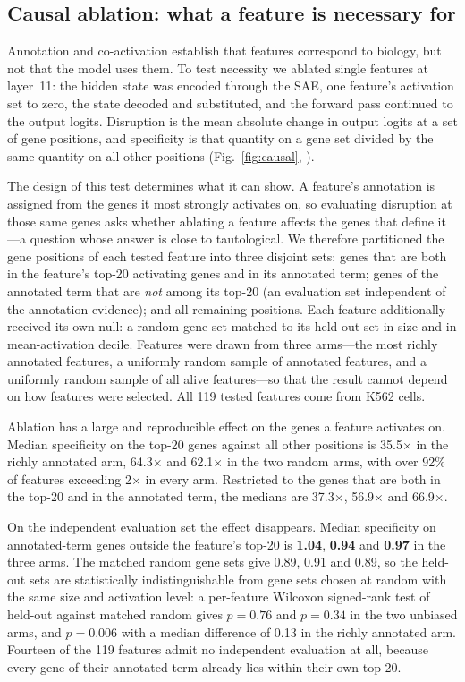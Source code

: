 \subsection*{Causal ablation: what a feature is necessary for}
\label{sec:causal}

Annotation and co-activation establish that features correspond to biology, but not that the model
uses them. To test necessity we ablated single features at layer~11: the hidden state was encoded
through the SAE, one feature's activation set to zero, the state decoded and substituted, and the
forward pass continued to the output logits. Disruption is the mean absolute change in output
logits at a set of gene positions, and specificity is that quantity on a gene set divided by the
same quantity on all other positions (Fig.~\ref{fig:causal}, ).

The design of this test determines what it can show. A feature's annotation is assigned from the
genes it most strongly activates on, so evaluating disruption at those same genes asks whether
ablating a feature affects the genes that define it---a question whose answer is close to
tautological. We therefore partitioned the gene positions of each tested feature into three disjoint
sets: genes that are both in the feature's top-20 activating genes and in its annotated term; genes
of the annotated term that are \emph{not} among its top-20 (an evaluation set independent of the
annotation evidence); and all remaining positions. Each feature additionally received its own null:
a random gene set matched to its held-out set in size and in mean-activation decile. Features were
drawn from three arms---the most richly annotated features, a uniformly random sample of annotated
features, and a uniformly random sample of all alive features---so that the result cannot depend on
how features were selected. All 119 tested features come from K562 cells.

Ablation has a large and reproducible effect on the genes a feature activates on. Median
specificity on the top-20 genes against all other positions is 35.5$\times$ in the richly annotated
arm, 64.3$\times$ and 62.1$\times$ in the two random arms, with over 92\% of features exceeding
2$\times$ in every arm. Restricted to the genes that are both in the top-20 and in the annotated
term, the medians are 37.3$\times$, 56.9$\times$ and 66.9$\times$.

On the independent evaluation set the effect disappears. Median specificity on annotated-term genes
outside the feature's top-20 is \textbf{1.04}, \textbf{0.94} and \textbf{0.97} in the three arms.
The matched random gene sets give 0.89, 0.91 and 0.89, so the held-out sets are statistically
indistinguishable from gene sets chosen at random with the same size and activation level: a
per-feature Wilcoxon signed-rank test of held-out against matched random gives $p = 0.76$ and
$p = 0.34$ in the two unbiased arms, and $p = 0.006$ with a median difference of 0.13 in the richly
annotated arm. Fourteen of the 119 features admit no independent evaluation at all, because every
gene of their annotated term already lies within their own top-20.

